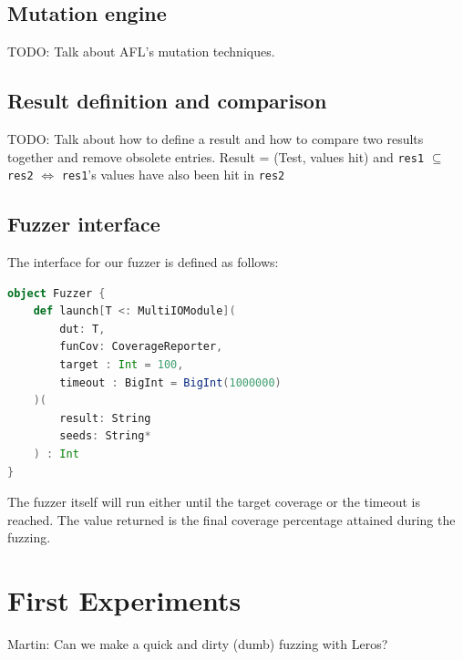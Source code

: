 \documentclass[conference]{IEEEtran}
\newcommand{\todo}[1]{{\color{olive} TODO: #1}}
\newcommand{\martin}[1]{{\color{blue} Martin: #1}}
\begin{document}
\subsection{Mutation engine}
\todo{Talk about AFL's mutation techniques.}

\subsection{Result definition and comparison}
\todo{Talk about how to define a result and how to compare two results together and remove obsolete entries. Result = (Test, values hit) and \texttt{res1} $\subseteq$ \texttt{res2} $\Leftrightarrow$  \texttt{res1}'s values have also been hit in \texttt{res2}}

\subsection{Fuzzer interface}
The interface for our fuzzer is defined as follows:
\begin{lstlisting}[captionpos=b,caption={Interface for the ChiselVerify fuzzer. It takes as parameter a \texttt{dut} and \texttt{chiselverify.coverage.CoverageReporter}, which is the verification plan used to define the functional coverage that will drive the fuzzing. It also takes in a target coverage percentage between 0 and 100, which defaults to 100, and a timeout which is set by default to 1'000'000 inputs. The second set of parameters are a result output file name, where all of the interesting tests and their resulting hit values will be written, as well as a variable number of file paths, which will be used as seeds for the mutation engine. },label={lst:dutexample},language=scala]
object Fuzzer {
    def launch[T <: MultiIOModule](
        dut: T, 
        funCov: CoverageReporter, 
        target : Int = 100,
        timeout : BigInt = BigInt(1000000)
    )(
        result: String
        seeds: String*
    ) : Int
}
\end{lstlisting}
The fuzzer itself will run either until the target coverage or the timeout is reached. The value returned is the final coverage percentage attained during the fuzzing.

\section{First Experiments}
\label{sec:eval}

\martin{Can we make a quick and dirty (dumb) fuzzing with Leros?}
\end{document}

